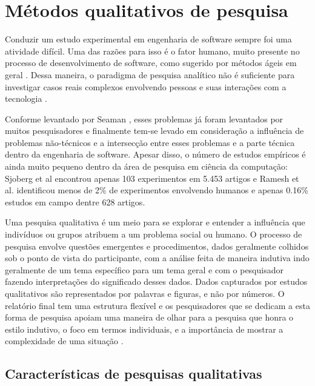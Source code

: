 \chapter{Métodos qualitativos de pesquisa} 
\label{cap:qualitativo}

Conduzir um estudo experimental em engenharia de software sempre foi uma
atividade difícil. Uma das razões para isso é o fator humano, muito presente 
no processo de desenvolvimento de software, como sugerido por métodos ágeis  em
geral \cite{AgileManifesto}. Dessa maneira, o paradigma de pesquisa analítico 
não é suficiente para investigar casos reais complexos envolvendo pessoas e 
suas interações com a tecnologia \cite{guidelines-case-study}.

Conforme levantado por Seaman \cite{seaman}, esses problemas já foram levantados
por muitos pesquisadores e finalmente tem-se levado em consideração a influência de
problemas não-técnicos e a intersecção entre esses problemas e a parte técnica
dentro da engenharia de software. 
Apesar disso, o número de estudos empíricos é ainda muito pequeno dentro da área
de pesquisa em ciência da computação: Sjoberg et al \cite{sjoberg} encontrou
apenas 103 experimentos em 5.453 artigos e Ramesh et al. \cite{ramesh}
identificou menos de 2\% de experimentos envolvendo humanos e apenas 0.16\% 
estudos em campo dentre 628 artigos.

Uma pesquisa qualitativa é um meio para se explorar e entender a influência que 
indivíduos ou grupos atribuem a um problema social ou humano. O processo de
pesquisa envolve questões emergentes e procedimentos, dados geralmente colhidos
sob o ponto de vista do participante, com a análise feita de maneira indutiva
indo geralmente de um tema específico para um tema geral e com o pesquisador
fazendo interpretações do significado desses dados. Dados capturados por estudos
qualitativos são representados por palavras e figuras, e não por números.
O relatório final tem uma estrutura flexível e os pesquisadores que se
dedicam a esta forma de pesquisa apoiam uma maneira de olhar para a pesquisa que
honra o estilo indutivo, o foco em termos individuais, e a importância de mostrar a 
complexidade de uma situação \cite{creswell}. 

\section{Características de pesquisas qualitativas}

